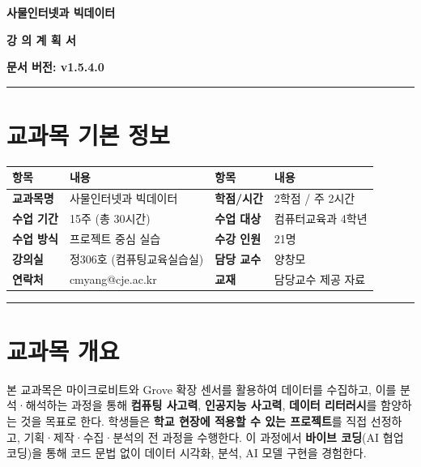 \documentclass[11pt, a4paper]{article}
\begin{document}
\begin{center}
{\fontsize{24pt}{28pt}\selectfont\bfseries\color{mainblue} 사물인터넷과 빅데이터}

\vspace{8pt}

{\Large\bfseries 강 의 계 획 서}

\vspace{8pt}

{\normalsize\bfseries 문서 버전: v1.5.4.0}
\end{center}

\vspace{5pt}
\noindent\rule{\textwidth}{0.5pt}

\section{교과목 기본 정보}

\begin{table}[H]
\centering
\begin{tabular}{|C{2.2cm}|L{4.5cm}|C{2.2cm}|L{4.5cm}|}
\hline
{}
\textbf{항목} & \textbf{내용} & \textbf{항목} & \textbf{내용} \\
\hline
\textbf{교과목명} & 사물인터넷과 빅데이터 & \textbf{학점/시간} & 2학점 / 주 2시간 \\
\hline
\textbf{수업 기간} & 15주 (총 30시간) & \textbf{수업 대상} & 컴퓨터교육과 4학년 \\
\hline
\textbf{수업 방식} & 프로젝트 중심 실습 & \textbf{수강 인원} & 21명 \\
\hline
\textbf{강의실} & 정306호 (컴퓨팅교육실습실) & \textbf{담당 교수} & 양창모 \\
\hline
\textbf{연락처} & cmyang@cje.ac.kr & \textbf{교재} & 담당교수 제공 자료 \\
\hline
\end{tabular}
\end{table}

\vspace{3pt}
\noindent\rule{\textwidth}{0.3pt}

\section{교과목 개요}

본 교과목은 마이크로비트와 Grove 확장 센서를 활용하여 데이터를 수집하고, 이를 분석·해석하는 과정을 통해 \textbf{컴퓨팅 사고력}, \textbf{인공지능 사고력}, \textbf{데이터 리터러시}를 함양하는 것을 목표로 한다. 학생들은 \textbf{학교 현장에 적용할 수 있는 프로젝트}를 직접 선정하고, 기획·제작·수집·분석의 전 과정을 수행한다. 이 과정에서 \textbf{바이브 코딩}(AI 협업 코딩)을 통해 코드 문법 없이 데이터 시각화, 분석, AI 모델 구현을 경험한다.
\end{document}
